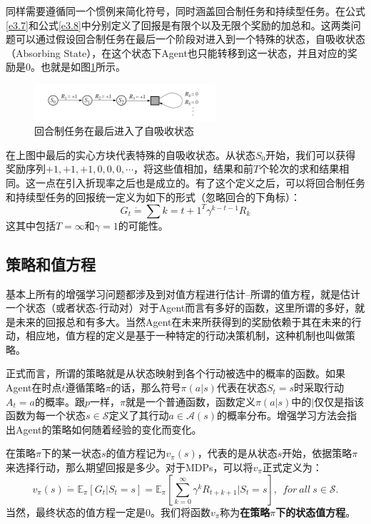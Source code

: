 \documentclass{ctexart}
\begin{document}
            同样需要遵循同一个惯例来简化符号，同时涵盖回合制任务和持续型任务。在公式\ref{e3.7}和公式\ref{e3.8}中分别定义了回报是有限个以及无限个奖励的加总和。这两类问题可以通过假设回合制任务在最后一个阶段对进入到一个特殊的状态，自吸收状态（Absorbing State），在这个状态下Agent也只能转移到这一状态，并且对应的奖励是0。也就是如图\ref{f3_1_1}所示。
            \begin{figure}[h]
                \centering
                \includegraphics[width=0.6\textwidth]{f3-1-1}
                \caption{回合制任务在最后进入了自吸收状态}
                \label{f3_1_1}
            \end{figure}
            在上图中最后的实心方块代表特殊的自吸收状态。从状态$S_0$开始，我们可以获得奖励序列$+1,+1,+1,0,0,0,\cdots$，将这些值相加，结果和前$T$个轮次的求和结果相同。这一点在引入折现率之后也是成立的。有了这个定义之后，可以将回合制任务和持续型任务的回报统一定义为如下的形式（忽略回合的下角标）：
            \begin{equation}
                G_t \dot{=} \sum{k = t+1}^T \gamma^{k-t-1} R_k
                \label{e3.11}
            \end{equation}
            这其中包括$T=\infty$和$\gamma=1$的可能性。

        \subsection{策略和值方程}
            基本上所有的增强学习问题都涉及到对值方程进行估计--所谓的值方程，就是估计一个状态（或者状态-行动对）对于Agent而言有多好的函数，这里所谓的多好，就是未来的回报总和有多大。当然Agent在未来所获得到的奖励依赖于其在未来的行动，相应地，值方程的定义是基于一种特定的行动决策机制，这种机制也叫做策略。

            正式而言，所谓的策略就是从状态映射到各个行动被选中的概率的函数。如果Agent在时点$t$遵循策略$\pi$的话，那么符号$\pi(a|s)$代表在状态$S_t=s$时采取行动$A_t=a$的概率。跟$p$一样，$\pi$就是一个普通函数，函数定义$\pi(a|s)$中的$|$仅仅是指该函数为每一个状态$s\in \mathcal{S}$定义了其行动$a\in \mathcal{A}(s)$的概率分布。增强学习方法会指出Agent的策略如何随着经验的变化而变化。

            在策略$\pi$下的某一状态$s$的值方程记为$v_{\pi}(s)$，代表的是从状态$s$开始，依据策略$\pi$来选择行动，那么期望回报是多少。对于MDPs，可以将$v_{\pi}$正式定义为：
            \begin{equation}
                v_{\pi}(s) \dot{=} \mathbb{E}_{\pi}[G_t|S_t=s] = \mathbb{E}_{\pi}[\sum_{k=0}^{\infty}\gamma^k R_{t+k+1}|S_t = s],\ \ for \ all \ s \in \mathcal{S}.
                \label{e3.12}
            \end{equation}
            当然，最终状态的值方程一定是0。我们将函数$v_{\pi}$称为\textbf{在策略$\pi$下的状态值方程}。
\end{document}
